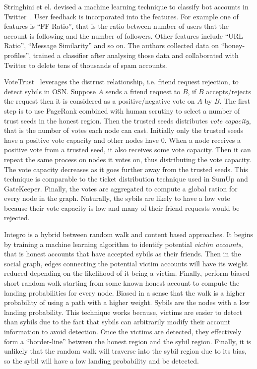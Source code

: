 Stringhini et el. devised a machine learning technique to classify bot accounts
in Twitter~\cite{stringhini2010detecting}. User feedback is incorporated into the
features. For example one of features is ``FF Ratio'', that is the ratio between
number of users that the account is following and the number of followers. Other
features include ``URL Ratio'', ``Message Similarity'' and so on. The authors
collected data on ``honey-profiles'', trained a classifier after analysing those
data and collaborated with Twitter to delete tens of thousands of spam accounts.

VoteTrust~\cite{xue2013votetrust} leverages the distrust relationship, i.e.
friend request rejection, to detect sybils in OSN. Suppose $A$ sends a friend
request to $B$, if $B$ accepts/rejects the request then it is considered as a
positive/negative vote on $A$ by $B$. The first step is to use PageRank combined
with human scrutiny to select a number of trust seeds in the honest region. Then
the trusted seeds distributes \emph{vote capacity}, that is the number of votes
each node can cast. Initially only the trusted seeds have a positive vote
capacity and other nodes have 0. When a node receives a positive vote from a
trusted seed, it also receives some vote capacity. Then it can repeat the same
process on nodes it votes on, thus distributing the vote capacity. The vote
capacity decreases as it goes further away from the trusted seeds. This
technique is comparable to the ticket distribution technique used in SumUp and
GateKeeper. Finally, the votes are aggregated to compute a global ration for
every node in the graph. Naturally, the sybils are likely to have a low vote
because their vote capacity is low and many of their friend requests would be
rejected.

Integro\cite{boshmaf2015integro} is a hybrid between random walk and content
based approaches. It begins by training a machine learning algorithm to identify
potential \emph{victim accounts}, that is honest accounts that have accepted
sybils as their friends. Then in the social graph, edges connecting the
potential victim accounts will have its weight reduced depending on the
likelihood of it being a victim. Finally, perform biased short random walk
starting from some known honest account to compute the landing probabilities for
every node. Biased in a sense that the walk is a higher probability of
using a path with a higher weight. Sybils are the nodes with a low landing
probability. This technique works because, victims are easier to detect than
sybils due to the fact that sybils can arbitrarily modify their account
information to avoid detection. Once the victims are detected, they effectively
form a ``border-line'' between the honest region and the sybil region. Finally,
it is unlikely that the random walk will traverse into the sybil region due to
its bias, so the sybil will have a low landing probability and be detected.

